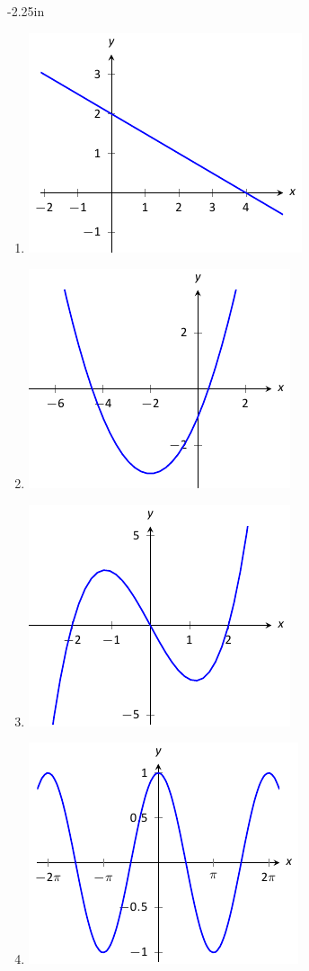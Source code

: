 \begin{adjustwidth*}{}{-2.25in}
\begin{multicols*}{2}
\begin{enumerate}[1),resume]
\item \includegraphics[scale=.8]{figures/fig02_01_ex_26}
\item \includegraphics[scale=.8]{figures/fig02_01_ex_27}
\item \includegraphics[scale=.8]{figures/fig02_01_ex_28}
\item \includegraphics[scale=.8]{figures/fig02_01_ex_29}


\end{enumerate}
\end{multicols*}
\end{adjustwidth*}
